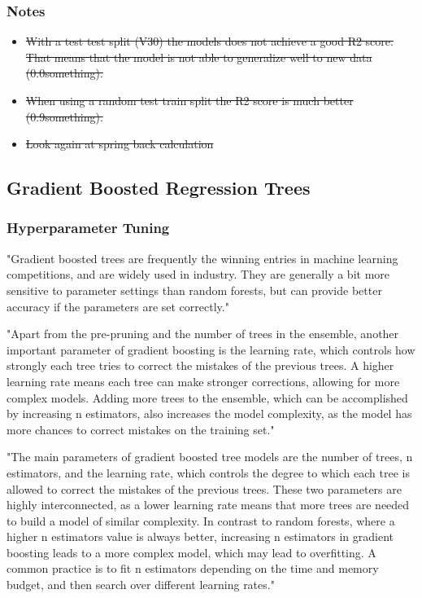 \subsubsection*{Notes}
\begin{itemize}
    \item \sout{With a test test split (V30) the models does not achieve a good R2 score. That means that the model is not able to generalize well to new data (0.0something).}
    \item \sout{When using a random test train split the R2 score is much better (0.9something).}
    \item  \sout{Look again at spring back calculation}
\end{itemize}



\subsection{Gradient Boosted Regression Trees}

\subsubsection*{Hyperparameter Tuning}

"Gradient boosted trees are frequently the winning entries in machine
learning competitions, and are widely used in industry. They are
generally a bit more sensitive to parameter settings than random
forests, but can provide better accuracy if the parameters are set
correctly." \cite[p. 88-89]{muller_introductionmachinelearning_2016}

"Apart from the pre-pruning and the number of trees in the ensemble,
another important parameter of gradient boosting is the learning rate,
which controls how strongly each tree tries to correct the mistakes of
the previous trees. A higher learning rate means each tree can make
stronger corrections, allowing for more complex models. Adding more trees to the ensemble, which can be accomplished by increasing
n estimators, also increases the model complexity, as the model has
more chances to correct mistakes on the training set." \cite[p. 88-89]{muller_introductionmachinelearning_2016}

"The main parameters of gradient boosted tree models are the number
of trees, n estimators, and the learning rate, which controls the degree to which each tree is allowed to correct the mistakes of the previous trees.
These two parameters are highly interconnected, as a lower
learning rate means that more trees are needed to build a model of
similar complexity. In contrast to random forests, where a higher
n estimators value is always better, increasing n estimators in gradient
boosting leads to a more complex model, which may lead to overfitting. A
common practice is to fit n estimators depending on the time and
memory budget, and then search over different learning rates." \cite[p. 88-89]{muller_introductionmachinelearning_2016}


